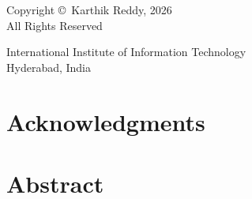 \documentclass[12pt,oneside]{report}
\begin{document}

\thispagestyle{empty}
\vspace*{\fill}
\begin{center}
Copyright \copyright\ Karthik Reddy, 2026\\
All Rights Reserved
\end{center}
\vspace*{\fill}
\clearpage
{}
{\centering International Institute of Information Technology\\Hyderabad, India\par}

\chapter*{Acknowledgments}

\clearpage
\chapter*{Abstract}

\clearpage
\tableofcontents
\listoffigures
\listoftables
\clearpage
{}






\appendix




\end{document}
